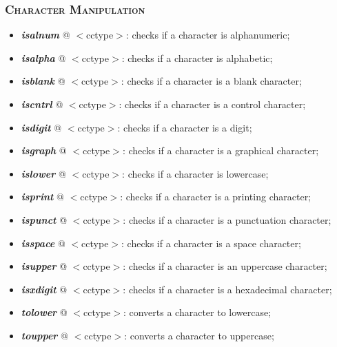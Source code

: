 \documentclass[10pt]{article}
\begin{document}
\begin{multicols*}{4}
{\subsubsection*{\textsc{Character Manipulation}} 
\begin{itemize}[leftmargin=*,topsep=0.25pt]
  \setlength\itemsep{-1.8pt}
\item  \emph{\textbf{isalnum}} @ $<$cctype$>$: checks if a character is alphanumeric;
\item  \emph{\textbf{isalpha}} @ $<$cctype$>$: checks if a character is alphabetic;
\item  \emph{\textbf{isblank}} @ $<$cctype$>$: checks if a character is a blank character;
\item  \emph{\textbf{iscntrl}} @ $<$cctype$>$: checks if a character is a control character;
\item  \emph{\textbf{isdigit}} @ $<$cctype$>$: checks if a character is a digit;
\item  \emph{\textbf{isgraph}} @ $<$cctype$>$: checks if a character is a graphical character;
\item  \emph{\textbf{islower}} @ $<$cctype$>$: checks if a character is lowercase;
\item  \emph{\textbf{isprint}} @ $<$cctype$>$: checks if a character is a printing character;
\item  \emph{\textbf{ispunct}} @ $<$cctype$>$: checks if a character is a punctuation character;
\item  \emph{\textbf{isspace}} @ $<$cctype$>$: checks if a character is a space character;
\item  \emph{\textbf{isupper}} @ $<$cctype$>$: checks if a character is an uppercase character;
\item  \emph{\textbf{isxdigit}} @ $<$cctype$>$: checks if a character is a hexadecimal character;
\item  \emph{\textbf{tolower}} @ $<$cctype$>$: converts a character to lowercase;
\item  \emph{\textbf{toupper}} @ $<$cctype$>$: converts a character to uppercase;
\end{itemize}


}
\end{multicols*}
\end{document}
